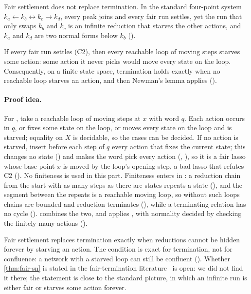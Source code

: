Fair settlement does not replace termination. In the standard four-point system
$k_a \leftarrow k_b \leftrightarrow k_c \rightarrow k_d$, every peak joins and every fair run settles,
yet the run that only swaps $k_b$ and $k_c$ is an infinite reduction that starves the other actions, and
$k_a$ and $k_d$ are two normal forms below $k_b$ ().

\begin{theorem}\label{thm:fair-sn}
If every fair run settles (C2), then every reachable loop of moving steps starves some action: some
action it never picks would move every state on the loop. Consequently, on a finite state space,
termination holds exactly when no reachable loop starves an action, and then Newman's lemma applies
().
\end{theorem}

\paragraph{Proof idea.}
For , take a reachable loop of moving steps at $x$ with word $q$. Each action occurs
in $q$, or fixes some state on the loop, or moves every state on the loop and is starved; equality on
$X$ is decidable, so the cases can be decided. If no action is starved, insert before each step of
$q$ every action that fixes the current state; this changes no state () and makes the
word pick every action (, ), so it is a fair lasso whose base point
$x$ is moved by the loop's opening step, a bad lasso that refutes C2 (). No
finiteness is used in this part. Finiteness enters in : a reduction chain from the
start with as many steps as there are states repeats a state (), and the segment
between the repeats is a reachable moving loop, so without such loops chains are bounded and reduction
terminates (), while a terminating relation has no cycle ().
 combines the two, and  applies , with normality
decided by checking the finitely many actions ().

Fair settlement replaces termination exactly when reductions cannot be hidden forever by starving an
action. The condition is exact for termination, not for confluence: a network with a starved loop
can still be confluent (). Whether \cref{thm:fair-sn} is stated in the
fair-termination literature~\cite{lehmann1981,francez1986} is open: we did not find it there; the
statement is close to the standard picture, in which an infinite run is either fair or starves some
action forever.

